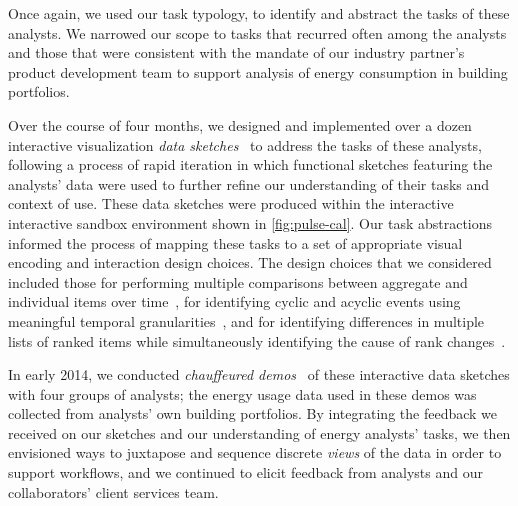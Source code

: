 Once again, we used our task typology, to identify and abstract the tasks of these analysts.
We narrowed our scope to tasks that recurred often among the analysts and those that were consistent with the mandate of our industry partner's product development team to support analysis of energy consumption in building portfolios.

Over the course of four months, we designed and implemented over a dozen interactive visualization {\it data sketches}~\cite{Lloyd2011} to address the tasks of these analysts, following a process of rapid iteration in which functional sketches featuring the analysts' data were used to further refine our understanding of their tasks and context of use.
These data sketches were produced within the interactive interactive sandbox environment shown in \autoref{fig:pulse-cal}.
Our task abstractions informed the process of mapping these tasks to a set of appropriate visual encoding and interaction design choices.
The design choices that we considered included those for performing multiple comparisons between aggregate and individual items over time~\cite{Aigner2011}, for identifying cyclic and acyclic events using meaningful temporal granularities~\cite{VanWijk1999}, and for identifying differences in multiple lists of ranked items while simultaneously identifying the cause of rank changes~\cite{Gratzl2013}.

In early 2014, we conducted {\it chauffeured demos}~\cite{Lloyd2011} of these interactive data sketches with four groups of analysts; the energy usage data used in these demos was collected from analysts' own building portfolios. 
By integrating the feedback we received on our sketches and our understanding of energy analysts' tasks, we then envisioned ways to juxtapose and sequence discrete {\it views} of the data in order to support workflows, and we continued to elicit feedback from analysts and our collaborators' client services team.


